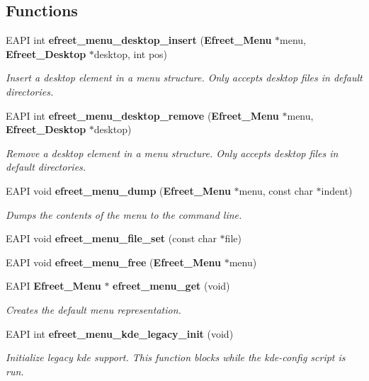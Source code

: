 \subsection*{Functions}
\begin{CompactItemize}
\item 
EAPI int {\bf efreet\_\-menu\_\-desktop\_\-insert} ({\bf Efreet\_\-Menu} $\ast$menu, {\bf Efreet\_\-Desktop} $\ast$desktop, int pos)
\begin{CompactList}\small\item\em Insert a desktop element in a menu structure. Only accepts desktop files in default directories. \item\end{CompactList}\item 
EAPI int {\bf efreet\_\-menu\_\-desktop\_\-remove} ({\bf Efreet\_\-Menu} $\ast$menu, {\bf Efreet\_\-Desktop} $\ast$desktop)
\begin{CompactList}\small\item\em Remove a desktop element in a menu structure. Only accepts desktop files in default directories. \item\end{CompactList}\item 
EAPI void {\bf efreet\_\-menu\_\-dump} ({\bf Efreet\_\-Menu} $\ast$menu, const char $\ast$indent)
\begin{CompactList}\small\item\em Dumps the contents of the menu to the command line. \item\end{CompactList}\item 
EAPI void {\bf efreet\_\-menu\_\-file\_\-set} (const char $\ast$file)
\item 
EAPI void {\bf efreet\_\-menu\_\-free} ({\bf Efreet\_\-Menu} $\ast$menu)
\item 
EAPI {\bf Efreet\_\-Menu} $\ast$ {\bf efreet\_\-menu\_\-get} (void)
\begin{CompactList}\small\item\em Creates the default menu representation. \item\end{CompactList}\item 
EAPI int {\bf efreet\_\-menu\_\-kde\_\-legacy\_\-init} (void)
\begin{CompactList}\small\item\em Initialize legacy kde support. This function blocks while the kde-config script is run. \item\end{CompactList}\item 

\end{CompactItemize}
